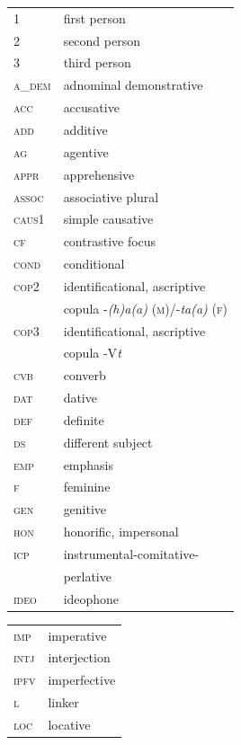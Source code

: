 \documentclass[output=paper,colorlinks,citecolor=brown,
]{langsci/langscibook}
\begin{document}
\begin{tabularx}{.5\textwidth}{@{}lQ@{}}
\textsc{1} & first person\\
\textsc{2} & second person\\
\textsc{3} & third person\\
\textsc{a\_dem} &  adnominal demonstrative\\
\textsc{acc} &  accusative\\
\textsc{add} &  additive\\
\textsc{ag} &  agentive\\
\textsc{appr} &  apprehensive\\
\textsc{assoc} &  associative plural\\
\textsc{caus1} &  simple causative\\
\textsc{cf} &  contrastive focus\\
\textsc{cond} &  conditional\\
\textsc{cop2} &  identificational, ascriptive \\ &  copula  -\textit{(h)a(a)} (\textsc{m})/-\textit{ta(a)} (\textsc{f})\\
\textsc{cop3} &  identificational, ascriptive \\ &  copula -V\textit{t}\\
\textsc{cvb} &  converb\\
\textsc{dat} &  dative\\
\textsc{def} &  definite\\
\textsc{ds} &  different subject\\
\textsc{emp} &  emphasis\\
\textsc{f} &  feminine\\
\textsc{gen} &  genitive\\
\textsc{hon} &  honorific, impersonal\\
\textsc{icp} &  instrumental-comitative-\\ &  perlative\\
\textsc{ideo} &  ideophone\end{tabularx}\begin{tabularx}{.5\textwidth}{@{}lQ@{}}
\textsc{imp} &  imperative\\
\textsc{intj} &  interjection\\
\textsc{ipfv} &  imperfective\\
\textsc{l} &  linker\\
\textsc{loc} &  locative\\

\end{tabularx}
\end{document}
